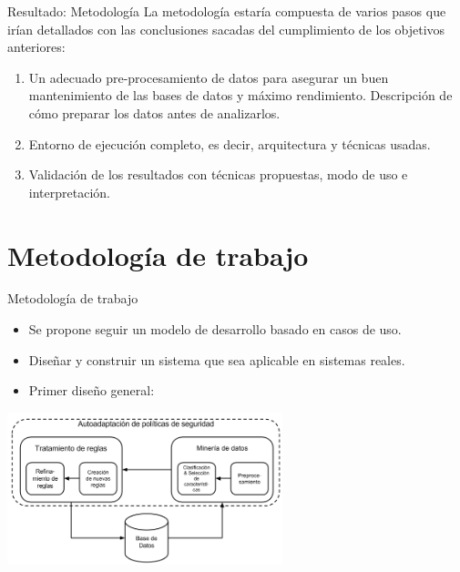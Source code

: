 \documentclass{beamer}
\begin{document}
\begin{frame}{Resultado: Metodología}
La metodología estaría compuesta de varios pasos que irían detallados con las conclusiones sacadas del cumplimiento de los objetivos anteriores:

\begin{enumerate}
  \item<1-> Un adecuado pre-procesamiento de datos para asegurar un buen mantenimiento de las bases de datos y máximo rendimiento. Descripción de cómo preparar los datos antes de analizarlos.
  \item<2-> Entorno de ejecución completo, es decir, arquitectura y técnicas usadas.
  \item<3-> Validación de los resultados con técnicas propuestas, modo de uso e interpretación.
\end{enumerate}

\end{frame}

\section{Metodología de trabajo}

\begin{frame}{Metodología de trabajo}

\begin{itemize}
  \item<1-> Se propone seguir un modelo de desarrollo basado en casos de uso.
  \item<2-> Diseñar y construir un sistema que sea aplicable en sistemas reales.
  \item<3-> Primer diseño general:
\end{itemize}

\begin{center}
\includegraphics[width=0.6\textwidth]{./imgs/KRS.png}
\end{center}

\end{frame}
\end{document}
